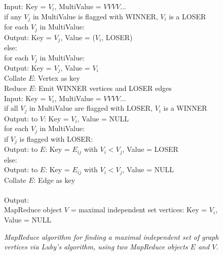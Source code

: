 \begin{figure}[htb]
\begin{center}
{\begin{minipage}{\textwidth}
\begin{tabbing}
       \> \> Input: Key = $V_i$, MultiValue = $V V V V ...$ \\
       \> \> if any $V_j$ in MultiValue is flagged with WINNER, $V_i$ is a LOSER \\
       \> \> \> for each $V_j$ in MultiValue: \\
       \> \> \> \> Output: Key = $V_j$, Value = ($V_i$, LOSER) \\
       \> \> else: \\
       \> \> \> for each $V_j$ in MultiValue: \\
       \> \> \> \> Output: Key = $V_j$, Value = $V_i$ \\
 Collate $E$: Vertex as key \\
 Reduce $E$: Emit WINNER vertices and LOSER edges \\
       \> \> Input: Key = $V_i$, MultiValue = $V V V V ...$ \\
       \> \> if all $V_j$ in MultiValue are flagged with LOSER, $V_i$ is a WINNER \\
       \> \> \> Output: to $V$: Key = $V_i$, Value = NULL \\
       \> \> for each $V_j$ in MultiValue: \\
       \> \> \> if $V_j$ is flagged with LOSER: \\
       \> \> \> \> Output: to $E$: Key = $E_{ij}$ with $V_i < V_j$, Value = LOSER \\
       \> \> \> else: \\
       \> \> \> \> Output: to $E$: Key = $E_{ij}$ with $V_i < V_j$, Value = NULL \\
 Collate $E$: Edge as key \\
\\
Output: \\
\> MapReduce object $V$ = maximal independent set vertices: Key = $V_i$, Value = NULL 
  \end{tabbing}
 \end{minipage}}\end{center}

 \caption{\it MapReduce algorithm for finding a maximal independent
 set of graph vertices via Luby's algorithm, using two MapReduce
 objects $E$ and $V$.}

 \label{fig:luby}
\end{figure}

